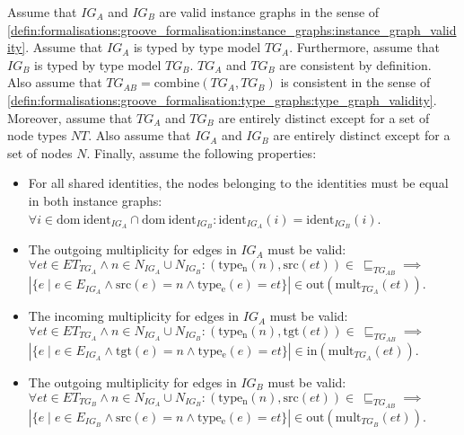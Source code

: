 \begin{lem}
\label{defin:transformation_framework:instance_models_and_instance_graphs:combining_instance_graphs:ig_combine_merge_correct}
Assume that $IG_A$ and $IG_B$ are valid instance graphs in the sense of \cref{defin:formalisations:groove_formalisation:instance_graphs:instance_graph_validity}. Assume that $IG_A$ is typed by type model $TG_A$. Furthermore, assume that $IG_B$ is typed by type model $TG_B$. $TG_A$ and $TG_B$ are consistent by definition. Also assume that $TG_{AB} = \mathrm{combine}(TG_A, TG_B)$ is consistent in the sense of \cref{defin:formalisations:groove_formalisation:type_graphs:type_graph_validity}. Moreover, assume that $TG_{A}$ and $TG_{B}$ are entirely distinct except for a set of node types $NT$. Also assume that $IG_{A}$ and $IG_{B}$ are entirely distinct except for a set of nodes $N$. Finally, assume the following properties:
\begin{itemize}
    \item For all shared identities, the nodes belonging to the identities must be equal in both instance graphs: $\forall i \in \mathrm{dom}\ \mathrm{ident}_{IG_A} \cap \mathrm{dom}\ \mathrm{ident}_{IG_B}\!: \mathrm{ident}_{IG_A}(i) = \mathrm{ident}_{IG_B}(i)$.
    \item The outgoing multiplicity for edges in $IG_A$ must be valid: $\forall et \in ET_{TG_A} \land n \in N_{IG_A} \cup N_{IG_B}\!: (\mathrm{type_n}(n), \mathrm{src}(et)) \in\ \sqsubseteq_{TG_{AB}} \implies$\\$|\{e \mid e \in E_{IG_A} \land \mathrm{src}(e) = n \land \mathrm{type_e}(e) = et \}| \in \mathrm{out}(\mathrm{mult}_{TG_{A}}(et))$.
    \item The incoming multiplicity for edges in $IG_A$ must be valid: $\forall et \in ET_{TG_A} \land n \in N_{IG_A} \cup N_{IG_B}\!: (\mathrm{type_n}(n), \mathrm{tgt}(et)) \in\ \sqsubseteq_{TG_{AB}} \implies$\\$|\{e \mid e \in E_{IG_A} \land \mathrm{tgt}(e) = n \land \mathrm{type_e}(e) = et \}| \in \mathrm{in}(\mathrm{mult}_{TG_{A}}(et))$.
    \item The outgoing multiplicity for edges in $IG_B$ must be valid: $\forall et \in ET_{TG_B} \land n \in N_{IG_A} \cup N_{IG_B}\!: (\mathrm{type_n}(n), \mathrm{src}(et)) \in\ \sqsubseteq_{TG_{AB}} \implies$\\$|\{e \mid e \in E_{IG_B} \land \mathrm{src}(e) = n \land \mathrm{type_e}(e) = et \}| \in \mathrm{out}(\mathrm{mult}_{TG_{B}}(et))$.

\end{itemize}
\end{lem}
